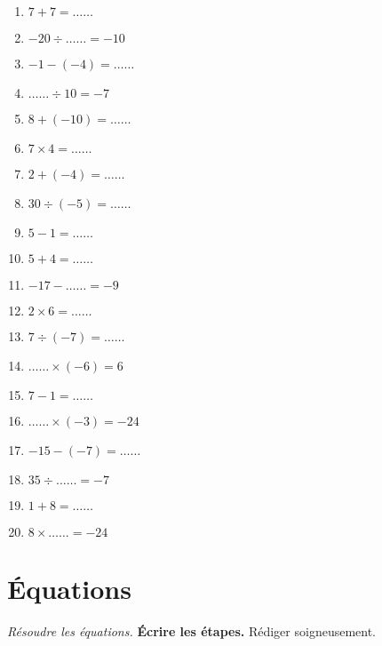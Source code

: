 \documentclass[12pt]{article}
\begin{document}
  \begin{multicols}{3}\noindent
    \begin{enumerate}
    \item $7 + 7 = \ldots\ldots$
    \item $-20 \div \ldots\ldots = -10$
    \item $-1 - \left( -4\right) = \ldots\ldots$
    \item $\ldots\ldots \div 10 = -7$
    \item $8 + \left( -10\right) = \ldots\ldots$
    \item $7 \times 4 = \ldots\ldots$
    \item $2 + \left( -4\right) = \ldots\ldots$
    \item $30 \div \left( -5\right) = \ldots\ldots$
    \item $5 - 1 = \ldots\ldots$
    \item $5 + 4 = \ldots\ldots$
    \item $-17 - \ldots\ldots = -9$
    \item $2 \times 6 = \ldots\ldots$
    \item $7 \div \left( -7\right) = \ldots\ldots$
    \item $\ldots\ldots \times \left( -6\right) = 6$
    \item $7 - 1 = \ldots\ldots$
    \item $\ldots\ldots \times \left( -3\right) = -24$
    \item $-15 - \left( -7\right) = \ldots\ldots$
    \item $35 \div \ldots\ldots = -7$
    \item $1 + 8 = \ldots\ldots$
    \item $8 \times \ldots\ldots = -24$
    \end{enumerate}
  \end{multicols}

    \section*{Équations}
  \textit{Résoudre les équations.} \textbf{Écrire les étapes.} Rédiger soigneusement.
\end{document}
